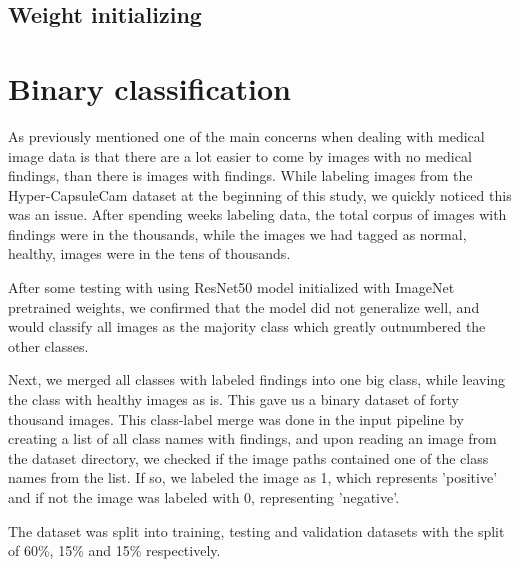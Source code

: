 \documentclass[thesis.tex]{subfiles}
\begin{document}
\subsection{Weight initializing}




\section{Binary classification} \label{sec:system_implementation}
As previously mentioned one of the main concerns when dealing with medical image data is that there are a lot easier to come by images with no medical findings, than there is images with findings. While labeling images from the Hyper-CapsuleCam dataset at the beginning of this study, we quickly noticed this was an issue. After spending weeks labeling data, the total corpus of images with findings were in the thousands, while the images we had tagged as normal, healthy, images were in the tens of thousands. 

After some testing with using ResNet50 model initialized with ImageNet pretrained weights, we confirmed that the model did not generalize well, and would classify all images as the majority class which greatly outnumbered the other classes. 

Next, we merged all classes with labeled findings into one big class, while leaving the class with healthy images as is. This gave us a binary dataset of forty thousand images. This class-label merge was done in the input pipeline by creating a list of all class names with findings, and upon reading an image from the dataset directory, we checked if the image paths contained one of the class names from the list. If so, we labeled the image as 1, which represents 'positive' and if not the image was labeled with 0, representing 'negative'.

The dataset was split into training, testing and validation datasets with the split of 60\%, 15\% and 15\% respectively.
\end{document}
